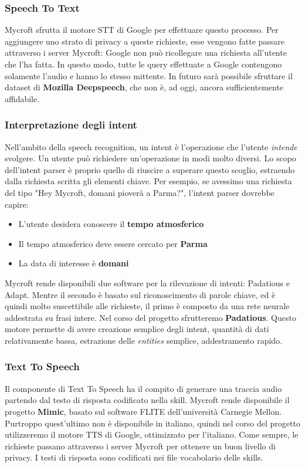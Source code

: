 \subsubsection{Speech To Text}
Mycroft sfrutta il motore STT di Google per effettuare questo processo. Per aggiungere uno strato di privacy a queste richieste, esse vengono fatte passare attraverso i server Mycroft: Google non può ricollegare una richiesta all'utente che l'ha fatta. In questo modo, tutte le query effettuate a Google contengono solamente l'audio e hanno lo stesso mittente. In futuro sarà possibile sfruttare il dataset di \textbf{Mozilla Deepspeech}, che non è, ad oggi, ancora sufficientemente affidabile.
\subsubsection{Interpretazione degli intent}
Nell'ambito della speech recognition, un intent è l'operazione che l'utente \textit{intende} svolgere. Un utente può richiedere un'operazione in modi molto diversi. Lo scopo dell'intent parser è proprio quello di riuscire a superare questo scoglio, estraendo dalla richiesta scritta gli elementi chiave. Per esempio, se avessimo una richiesta del tipo "Hey Mycroft, domani pioverà a Parma?", l'intent parser dovrebbe capire:
\begin{itemize}
    \item L'utente desidera conoscere il \textbf{tempo atmosferico}
    \item Il tempo atmosferico deve essere cercato per \textbf{Parma}
    \item La data di interesse è \textbf{domani}
\end{itemize}
Mycroft rende disponibili due software per la rilevazione di intenti: Padatious e Adapt. Mentre il secondo è basato sul riconoscimento di parole chiave, ed è quindi molto suscettibile alle richieste, il primo è composto da una rete neurale addestrata su frasi intere. Nel corso del progetto sfrutteremo \textbf{Padatious}.
Questo motore permette di avere creazione semplice degli intent, quantità di dati relativamente bassa, estrazione delle \textit{entities} semplice, addestramento rapido.
\subsubsection{Text To Speech}
Il componente di Text To Speech ha il compito di generare una traccia audio partendo dal testo di risposta codificato nella skill. Mycroft rende disponibile il progetto \textbf{Mimic}, basato sul software FLITE dell'università Carnegie Mellon. Purtroppo quest'ultimo non è disponibile in italiano, quindi nel corso del progetto utilizzeremo il motore TTS di Google, ottimizzato per l'italiano. Come sempre, le richieste passano attraverso i server Mycroft per ottenere un buon livello di privacy.
I testi di risposta sono codificati nei file vocabolario delle skills.
